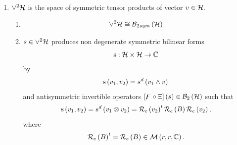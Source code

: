 \begin{enumerate}
\begin{enumerate}
\item Non degenerate antisymmetric bilinear products on ${\cal H}$ can be
denoted by 
\begin{equation}
\left\{ \left. v_{1}\right\vert v_{2}\right\} _{g}={\rm g}\left(
v_{1},v_{2}\right) .
\end{equation}

\item The invariance groupof ${\rm g}$ is the complex symplectic group $%
Sp\left( {\cal H}\right) $ and defined as 
\begin{equation}
\left\{ \left. T\in GL\left( {\cal H}\right) \right\vert \left\{
Tv_{1},Tv_{2}\right\} ={\rm g}\left\{ Tv_{1},Tv_{2}\right\} ={\rm g}\left(
v_{1},v_{2}\right) =\left\{ v_{1},v_{2}\right\} \forall v_{1},v_{2}\in {\cal %
H}\right\}
\end{equation}
\end{enumerate}

\item ${\LARGE \vee }^{2}{\cal H}$ is the space of symmetric tensor products
of vector $v\in {\cal H}.$

\begin{enumerate}
\item 
\begin{equation}
{\LARGE \vee }^{2}{\cal H\cong B}_{2sym}\left( {\cal H}\right)
\end{equation}

\item $s\in {\LARGE \vee }^{2}{\cal H}$ produces non degenerate symmetric
bilinear forms 
\begin{equation}
{\rm s}:{\cal H\times H}\rightarrow {\Bbb C}
\end{equation}%
by 
\begin{equation}
{\rm s}\left( v_{1},v_{2}\right) =s^{d}\left( v_{1}\wedge v\right)
\end{equation}%
and antisymmetric invertible operators $\left[ \digamma \circ \Xi \right]
\left( s\right) \in {\cal B}_{2}\left( {\cal H}\right) $ such that 
\begin{equation}
{\rm s}\left( v_{1},v_{2}\right) =s^{d}\left( v_{1}\otimes v_{2}\right) =%
{\cal R}_{e}\left( v_{2}\right) ^{t}{\cal R}_{e}\left( B\right) {\cal R}%
_{e}\left( v_{2}\right) ,
\end{equation}%
where 
\begin{equation}
{\cal R}_{e}\left( B\right) ^{t}={\cal R}_{e}\left( B\right) \in {\cal M}%
\left( r,r,{\Bbb C}\right) .
\end{equation}


\end{enumerate}
\end{enumerate}
